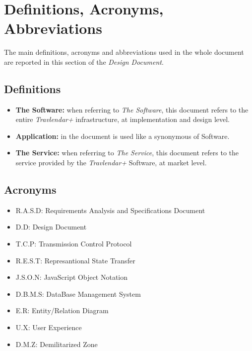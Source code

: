 \section{Definitions, Acronyms, Abbreviations}
The main definitions, acronyms and abbreviations used in the whole document are reported in this section of the \emph{Design Document}.

\subsection{Definitions}
\begin{itemize}
    \item   \textbf{The Software:} when referring to \emph{The Software}, this document refers to the entire                  \emph{Travlendar+} infrastructure, at implementation and design level.
        
    \item   \textbf{Application:} in the document is used like a synonymous of Software.
  
    \item   \textbf{The Service:}  when referring to \emph{The Service}, this document refers to the service provided         by the \emph{Travlendar+} Software, at market level.
\end{itemize}

\subsection{Acronyms}
\begin{itemize}
    \item R.A.S.D: Requirements Analysis and Specifications Document
    \item D.D: Design Document
    \item T.C.P: Transmission Control Protocol
    \item R.E.S.T: Represantional State Transfer
    \item J.S.O.N: JavaScript Object Notation
    \item D.B.M.S: DataBase Management System
    \item E.R: Entity/Relation Diagram
    \item U.X: User Experience
    \item D.M.Z: Demilitarized Zone
\end{itemize}